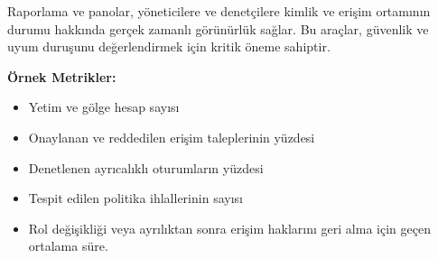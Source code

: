 Raporlama ve panolar, yöneticilere ve denetçilere kimlik ve erişim ortamının durumu hakkında gerçek zamanlı görünürlük sağlar. Bu araçlar, güvenlik ve uyum duruşunu değerlendirmek için kritik öneme sahiptir.

\textbf{Örnek Metrikler:}
\begin{itemize}
    \item Yetim ve gölge hesap sayısı
    \item Onaylanan ve reddedilen erişim taleplerinin yüzdesi
    \item Denetlenen ayrıcalıklı oturumların yüzdesi
    \item Tespit edilen politika ihlallerinin sayısı
    \item Rol değişikliği veya ayrılıktan sonra erişim haklarını geri alma için geçen ortalama süre.
\end{itemize}
